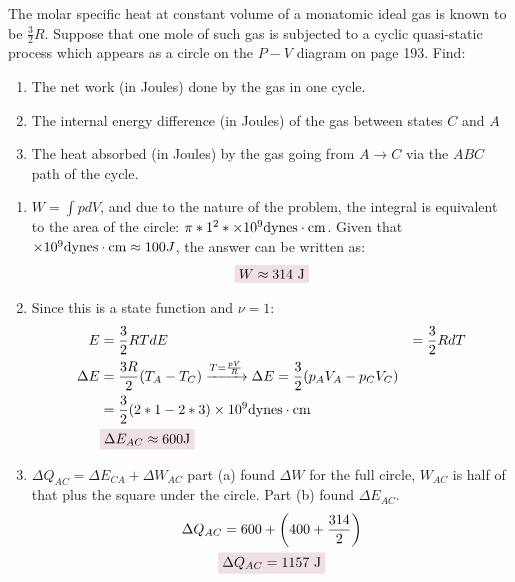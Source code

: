 \documentclass{article}
\begin{document}
    \begin{problem}[Reif 5.2]
        The molar specific heat at constant volume of a monatomic ideal gas is known to be $\frac{3}{2}R$. Suppose that one mole of such gas is subjected to a cyclic quasi-static process which appears as a circle on the $P-V$ diagram on page 193. Find: 
        \begin{enumerate}[label=(\alph*)]
            \item The net work (in Joules) done by the gas in one cycle.
            \item The internal energy difference (in Joules) of the gas between states $C$ and $A$
            \item The heat absorbed (in Joules) by the gas going from $A\rightarrow C$ via the $ABC$ path of the cycle.
        \end{enumerate}
        \answerline
        \begin{enumerate}[label=\alph*)]
            \item $W=\int pdV$, and due to the nature of the problem, the integral is equivalent to the area of the circle: $\pi*1^2*\ten{9}\text{dynes}\cdot\text{cm}$. Given that $\ten{9}\text{dynes}\cdot\text{cm}\approx100J$, the answer can be written as: $$\coloredanswer{W\approx314\ \text{J}}$$
            \item Since this is a state function and $\nu=1$:
            \begin{align*}
                E&=\frac{3}{2}RT
                dE &= \frac{3}{2}R dT 
                \\
                \Delta E &=\frac{3 R}{2}(T_A-T_C)
                \xrightarrow{T=\frac{pV}{R}}
                \Delta E= \frac{3}{2}\qty(p_AV_A-p_CV_C)
                \\
                &=\frac{3}{2}\qty(2*1-2*3)\ten{9}\text{dynes}\cdot\text{cm}
                \\
                &\coloredanswer{\Delta E_{AC}\approx600 \text{J}}
            \end{align*}
            \item $\Delta Q_{AC}=\Delta E_{CA}+\Delta W_{AC}$ part (a) found $\Delta W$ for the full circle, $W_{AC}$ is half of that plus the square under the circle. Part (b) found $\Delta E_{AC}$. 
            \begin{gather*}
                \Delta Q_{AC}=600+\qty(400+\frac{314}{2})
                \\
                \coloredanswer{\Delta Q_{AC}=1157\ \text{J}}
            \end{gather*}
        \end{enumerate}
    \end{problem}\newpage
\end{document}
